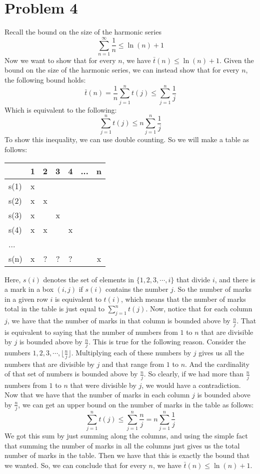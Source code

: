 \documentclass{article}
\begin{document}
\section*{Problem 4}
Recall the bound on the size of the harmonic series
\[ \sum_{n=1}^{\infty} \frac{1}{n} \leq \ln(n) + 1 \]
Now we want to show that for every $n$, we have $\bar{t}(n) \leq \ln(n) + 1$.
Given the bound on the size of the harmonic series, we can instead show that
for every $n$, the following bound holds:
\[ \bar{t}(n) = \frac{1}{n} \sum_{j=1}^n t(j) \leq \sum_{j=1}^n \frac{1}{j} \]
Which is equivalent to the following:
\[ \sum_{j=1}^n t(j) \leq n \sum_{j=1}^n \frac{1}{j} \]
To show this inequality, we can use double counting. So we will make a table
as follows:

\vspace{2mm}
\begin{tabular}{ | l | c | c | c | c | c | c |}
    \hline
         & 1 & 2 & 3 & 4 & ... & n \\ \hline
    s(1) & x &   &   &   &     &   \\ \hline
    s(2) & x & x &   &   &     &   \\ \hline
    s(3) & x &   & x &   &     &   \\ \hline
    s(4) & x & x &   & x &     &   \\ \hline
    ...  &   &   &   &   &     &   \\ \hline
    s(n) & x & ? & ? & ? &     & x \\ \hline
\end{tabular}
\vspace{2mm}

\noindent Here, $s(i)$ denotes the set of elements in $\{1,2,3,\cdots,i\}$ that
divide $i$, and there is a mark in a box $(i,j)$ if $s(i)$ contains the number
$j$. So the number of marks in a given row $i$ is equivalent to $t(i)$, which
means that the number of marks total in the table is just equal to
$\sum_{j=1}^n t(j)$.
Now, notice that for each column $j$, we have that the number of marks in that
column is bounded above by $\frac{n}{j}$. That is equivalent to saying that the
number of numbers from $1$ to $n$ that are divisible by $j$ is bounded above by
$\frac{n}{j}$. This is true for the following reason.
Consider the numbers $1, 2, 3, \cdots, \lfloor \frac{n}{j} \rfloor$.
Multiplying each of these numbers by $j$ gives us all the numbers that are
divisible by $j$ and that range from $1$ to $n$. And the cardinality of that set of
numbers is bounded above by $\frac{n}{j}$. So clearly, if we had more than
$\frac{n}{j}$ numbers from $1$ to $n$ that were divisible by $j$, we would have
a contradiction. Now that we have that the number of marks in each column
$j$ is bounded above by $\frac{n}{j}$, we can get an upper bound on the number
of marks in the table as follows:
\[ \sum_{j=1}^n t(j) \leq \sum_{j=1}^n \frac{n}{j} = n\sum_{j=1}^n \frac{1}{j} \]
We got this sum by just summing along the columns, and using the simple fact
that summing the number of marks in all the columns just gives us the total
number of marks in the table. Then we have that
this is exactly the bound that we wanted. So, we can conclude that for every
$n$, we have $\bar{t}(n) \leq \ln(n) + 1$.
\end{document}
